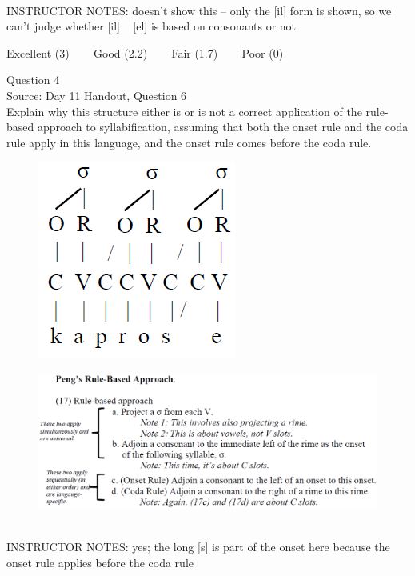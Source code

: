 \documentclass[12pt]{article}
\begin{document}
~\\
INSTRUCTOR NOTES: doesn't show this -- only the [il] form is shown, so we can't judge whether [il] ~ [el] is based on consonants or not


\vfill
Excellent (3) ~~~ Good (2.2) ~~~ Fair (1.7) ~~~ Poor (0)
\newpage

{\large Question 4}\\

Source: Day 11 Handout, Question 6\\

Explain why this structure either is or is not a correct application of the rule-based approach to syllabification, assuming that both the onset rule and the coda rule apply in this language, and the onset rule comes before the coda rule.\\

\begin{figure}[H]
\includegraphics{../images/pengrules_kaprosse_yes.png}
\end{figure}
\begin{figure}[H]
\includegraphics{../images/peng_rules.png}
\end{figure}

~\\
INSTRUCTOR NOTES: yes; the long [s] is part of the onset here because the onset rule applies before the coda rule
\end{document}

